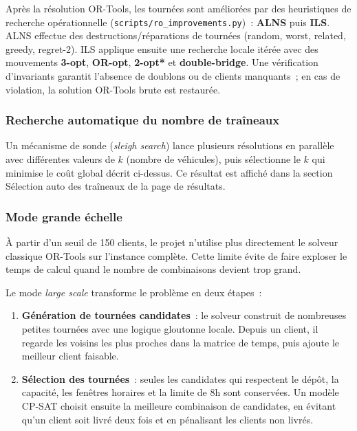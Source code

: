 \documentclass[a4paper, 12pt, twoside]{article}
\begin{document}
Apr\`{e}s la r\'{e}solution OR-Tools, les tourn\'{e}es sont am\'{e}lior\'{e}es par des heuristiques
de recherche op\'{e}rationnelle (\texttt{scripts/ro\_improvements.py})~:
\textbf{ALNS} puis \textbf{ILS}. ALNS effectue des destructions/r\'{e}parations de
tourn\'{e}es (random, worst, related, greedy, regret-2). ILS applique ensuite une
recherche locale it\'{e}r\'{e}e avec des mouvements \textbf{3-opt}, \textbf{OR-opt},
\textbf{2-opt*} et \textbf{double-bridge}. Une v\'{e}rification d'invariants garantit
l'absence de doublons ou de clients manquants~; en cas de violation, la solution
OR-Tools brute est restaur\'{e}e.

\subsubsection{Recherche automatique du nombre de tra\^{i}neaux}

Un m\'{e}canisme de sonde (\textit{sleigh search}) lance plusieurs r\'{e}solutions en parall\`{e}le
avec diff\'{e}rentes valeurs de $k$ (nombre de v\'{e}hicules), puis s\'{e}lectionne le $k$ qui
minimise le co\^{u}t global d\'{e}crit ci-dessus. Ce r\'{e}sultat est affich\'{e} dans la
section \og S\'{e}lection auto des tra\^{i}neaux \fg{} de la page de r\'{e}sultats.

\subsubsection{Mode grande \'{e}chelle}

\`{A} partir d'un seuil de 150 clients, le projet n'utilise plus directement le solveur
classique OR-Tools sur l'instance compl\`{e}te. Cette limite \'{e}vite de faire exploser
le temps de calcul quand le nombre de combinaisons devient trop grand.

Le mode \textit{large scale} transforme le probl\`{e}me en deux \'{e}tapes~:
\begin{enumerate}
  \item \textbf{G\'{e}n\'{e}ration de tourn\'{e}es candidates}~: le solveur construit de nombreuses
        petites tourn\'{e}es avec une logique gloutonne locale. Depuis un client, il regarde
        les voisins les plus proches dans la matrice de temps, puis ajoute le meilleur client
        faisable.
  \item \textbf{S\'{e}lection des tourn\'{e}es}~: seules les candidates qui respectent le d\'{e}p\^{o}t,
        la capacit\'{e}, les fen\^{e}tres horaires et la limite de 8h sont conserv\'{e}es.
        Un mod\`{e}le CP-SAT choisit ensuite la meilleure combinaison de candidates, en
        \'{e}vitant qu'un client soit livr\'{e} deux fois et en p\'{e}nalisant les clients non
        livr\'{e}s.
\end{enumerate}
\end{document}
